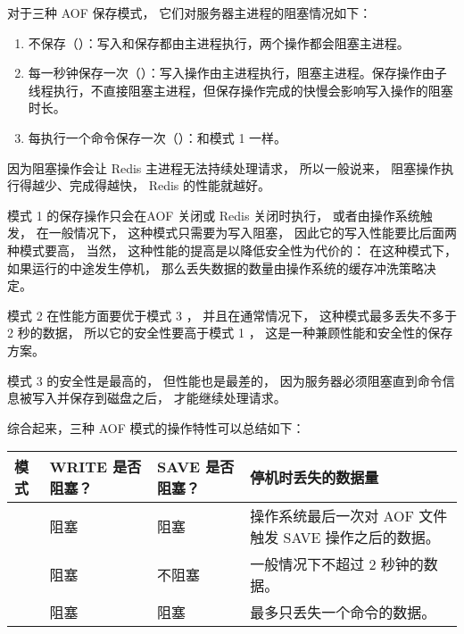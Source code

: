 \documentclass[a4paper,11pt,english]{sphinxmanual}
\begin{document}
对于三种 AOF 保存模式，
它们对服务器主进程的阻塞情况如下：
\begin{enumerate}
\item {} 
不保存（）：写入和保存都由主进程执行，两个操作都会阻塞主进程。

\item {} 
每一秒钟保存一次（）：写入操作由主进程执行，阻塞主进程。保存操作由子线程执行，不直接阻塞主进程，但保存操作完成的快慢会影响写入操作的阻塞时长。

\item {} 
每执行一个命令保存一次（）：和模式 1 一样。

\end{enumerate}

因为阻塞操作会让 Redis 主进程无法持续处理请求，
所以一般说来，
阻塞操作执行得越少、完成得越快，
Redis 的性能就越好。

模式 1 的保存操作只会在AOF 关闭或 Redis 关闭时执行，
或者由操作系统触发，
在一般情况下，
这种模式只需要为写入阻塞，
因此它的写入性能要比后面两种模式要高，
当然，
这种性能的提高是以降低安全性为代价的：
在这种模式下，
如果运行的中途发生停机，
那么丢失数据的数量由操作系统的缓存冲洗策略决定。

模式 2 在性能方面要优于模式 3 ，
并且在通常情况下，
这种模式最多丢失不多于 2 秒的数据，
所以它的安全性要高于模式 1 ，
这是一种兼顾性能和安全性的保存方案。

模式 3 的安全性是最高的，
但性能也是最差的，
因为服务器必须阻塞直到命令信息被写入并保存到磁盘之后，
才能继续处理请求。

综合起来，三种 AOF 模式的操作特性可以总结如下：

\begin{tabulary}{\linewidth}{|p{4cm}|p{2cm}|p{1.8cm}|p{6cm}|}
\hline
\textbf{
模式
} & \textbf{
WRITE 是否阻塞？
} & \textbf{
SAVE 是否阻塞？
} & \textbf{
停机时丢失的数据量
}\\\hline

 & 
阻塞
 & 
阻塞
 & 
操作系统最后一次对 AOF 文件触发 SAVE 操作之后的数据。
\\\hline

 & 
阻塞
 & 
不阻塞
 & 
一般情况下不超过 2 秒钟的数据。
\\\hline

 & 
阻塞
 & 
阻塞
 & 
最多只丢失一个命令的数据。
\\\hline
\end{tabulary}
\end{document}
